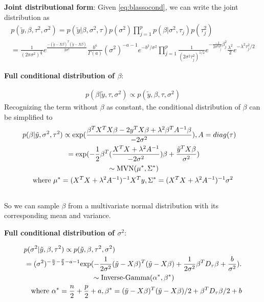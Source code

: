 \textbf{Joint distributional form}:
Given \autoref{eq:blassocond}, we can write the joint distribution as
\begin{equation}
	\begin{multlined}
		p(\tilde{y},\beta,\tau^2,\sigma^2) = p(\tilde{y}|\beta,\sigma^2,\tau)p(\sigma^2)\prod_{j=1}^p p(\beta|\sigma^2,\tau_j)p(\tau_j^2)\\
		=\frac{1}{(2\pi\sigma^2)^{\frac{n}{2}}} e^{\frac{-(\tilde{y} -X\beta)^T(\tilde{y}-X\beta)}{2\sigma^2}}
		\frac{b^a}{\Gamma(a)} (\sigma^2)^{-a-1}e^{-b^2/\sigma^2}
		\prod_{j=1}^p \frac{1}{(2\sigma^2\tau_j^2)^{1/2}}e^{-\frac{-1}{2\sigma^2\tau_j^2}\beta_j^2}\frac{\lambda^2}{2}e^{-\lambda^2\tau_j^2/2}
	\end{multlined}
\end{equation}

\textbf{Full conditional distribution of $\beta$}:

\begin{equation}
	\begin{multlined}
		p(\beta | \tilde{y},\tau,\sigma^2) \propto  	p(\tilde{y},\beta,\tau,\sigma^2)
	\end{multlined}
\end{equation}
Recognizing the term without $\beta$ as constant, the conditional distribution of $\beta$ can be simplified to
\begin{equation}
	\begin{multlined}
		p(\beta|\tilde{y},\sigma^2,\tau^2) \propto \textnormal{exp}(\frac{\beta^TX^TX\beta - 2y^TX\beta +\lambda^2\beta^TA^{-1}\beta}{-2\sigma^2}), A = diag(\tau)\\
		=  \textnormal{exp}(-\frac{1}{2}\beta^T(\frac{X^TX + \lambda^2A^{-1}}{-2\sigma^2})\beta + \frac{\tilde{y}^TX\beta}{\sigma^2})\\
		\sim \textnormal{MVN}(\mu^*,\Sigma^*)\\
		\textnormal{where } \mu^* = (X^TX+\lambda^2A^{-1})^{-1}X^Ty, \Sigma^* = (X^TX+\lambda^2A^{-1})^{-1}\sigma^2\\
	\end{multlined}
\end{equation}
So we can sample $\beta$ from a multivariate normal distribution with its corresponding mean and variance.

\textbf{Full conditional distribution of $\sigma^2$}:

\begin{equation}
	\begin{multlined}
		p(\sigma^2|\tilde{y},\beta,\tau^2) \propto  	p(\tilde{y},\beta,\tau^2,\sigma^2)  \\
		= (\sigma^2)^{-\frac{n}{2}-\frac{p}{2}-a-1}\textnormal{exp}(-\frac{1}{2\sigma^2}(\tilde{y}-X\beta)^T(\tilde{y}-X\beta)+\frac{1}{2\sigma^2}\beta^TD_{\tau}\beta+\frac{b}{\sigma^2}).\\
		\sim \textnormal{Inverse-Gamma}(\alpha^*,\beta^*)\\
		\textnormal{where } \alpha^* = \frac{n}{2}+\frac{p}{2}+a, \beta^* = 
		(\tilde{y}-X\beta)^T(\tilde{y}-X\beta)/2 + \beta^TD_{\tau}\beta/2 +b
	\end{multlined}
\end{equation}

